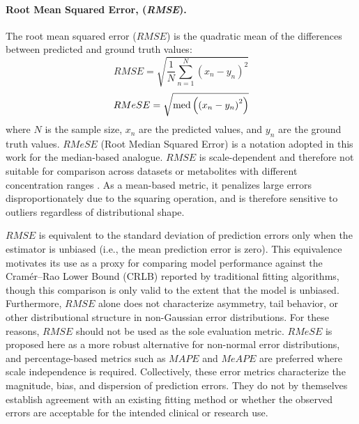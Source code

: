 \paragraph{Root Mean Squared Error, (\textit{RMSE}).}
The root mean squared error ($RMSE$) is the quadratic mean of the differences between predicted and ground truth values:
\begin{equation}\label{eqn:rmse}
    RMSE = \sqrt{\frac{1}{N}\sum_{n=1}^N\left(x_n - y_n \right)^2} %
\end{equation}
\begin{equation}\label{eqn:rmese}
    RMeSE = \sqrt{\textnormal{med}\left(\left(x_n - y_n \right)^2\right)}
\end{equation}
\noindent where $N$ is the sample size, $x_n$ are the predicted values, and $y_n$ are the ground truth values. $RMeSE$ (Root Median Squared Error) is a notation adopted in this work for the median-based analogue. $RMSE$ is scale-dependent and therefore not suitable for comparison across datasets or metabolites with different concentration ranges \cite{Hyndman2006}. As a mean-based metric, it penalizes large errors disproportionately due to the squaring operation, and is therefore sensitive to outliers regardless of distributional shape.

$RMSE$ is equivalent to the standard deviation of prediction errors only when the estimator is unbiased (i.e., the mean prediction error is zero). This equivalence motivates its use as a proxy for comparing \DL model performance against the Cram\'{e}r--Rao Lower Bound (CRLB) reported by traditional fitting algorithms, though this comparison is only valid to the extent that the \DL model is unbiased. Furthermore, $RMSE$ alone does not characterize asymmetry, tail behavior, or other distributional structure in non-Gaussian error distributions. For these reasons, $RMSE$ should not be used as the sole evaluation metric. $RMeSE$ is proposed here as a more robust alternative for non-normal error distributions, and percentage-based metrics such as $MAPE$ and $MeAPE$ are preferred where scale independence is required. Collectively, these error metrics characterize the magnitude, bias, and dispersion of prediction errors. They do not by themselves establish agreement with an existing fitting method or whether the observed errors are acceptable for the intended clinical or research use.

